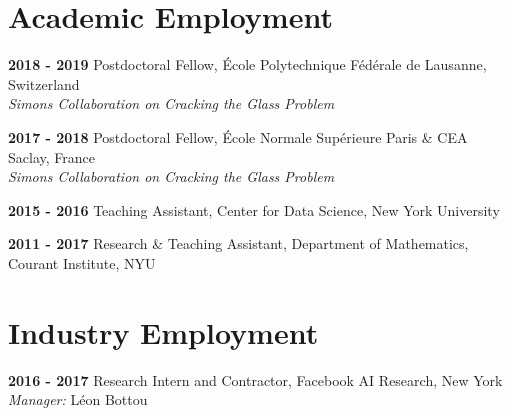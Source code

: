 \documentclass[10pt,letterpaper]{article}
\renewenvironment{itemize}
{
\begin{list}{}{\setlength{\leftmargin}{1.5em}}
}
{
  \end{list}
}
\begin{document}
\section*{Academic Employment}
\begin{itemize}
\item \textbf{2018 - 2019 } Postdoctoral Fellow, \'Ecole Polytechnique F\'ed\'erale de Lausanne, Switzerland \\ 
\hspace*{2cm} \textit{Simons Collaboration on Cracking the Glass Problem}

\item \textbf{2017 - 2018 } Postdoctoral Fellow, \'Ecole Normale Sup\'erieure Paris \& CEA Saclay, France \\ 
\hspace*{2cm} \textit{Simons Collaboration on Cracking the Glass Problem}

\item \textbf{2015 - 2016 } Teaching Assistant, Center for Data Science, New York University

\item \textbf{2011 - 2017 } Research \& Teaching Assistant, Department of Mathematics, Courant Institute, NYU
\end{itemize}

\section*{Industry Employment}
\begin{itemize}
\item \textbf{2016 - 2017 } Research Intern and Contractor, Facebook AI Research, New York \\ 
\hspace*{2cm} \textit{Manager: }{L\'eon Bottou}
\end{itemize}
\end{document}
